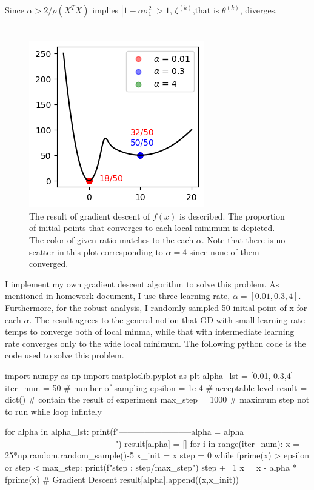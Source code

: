 \documentclass[10pt]{article}
\begin{document}
Since $\alpha > 2/\rho(X^TX)$ implies $\left|1-\alpha \sigma_1^2\right|>1$, $\zeta^{(k)}$,that is $\theta^{(k)}$, diverges.



\section{}
\begin{figure}[!h]
    \begin{center}
        \includegraphics{Fig1.png}
        \caption{The result of gradient descent of $f(x)$ is described. The proportion of initial points that converges to each local minimum is depicted. The color of given ratio matches to the each $\alpha$. Note that there is no scatter in this plot corresponding to $\alpha = 4$ since none of them converged. }
    \end{center}
\end{figure}

I implement my own gradient descent algorithm to solve this problem. As mentioned in homework document, I use three learning rate, $\alpha = [0.01,0.3,4]$. Furthermore,
for the robust analysis, I randomly sampled 50 initial point of x for each $\alpha$. The result agrees to the general notion that GD with small learning rate temps to converge both of local minma, while that with intermediate learning rate converges only to the wide local minimum. 
The following python code is the code used to solve this problem.

\begin{python}
import numpy as np
import matplotlib.pyplot as plt
alpha_lst = [0.01, 0.3,4]
iter_num = 50 # number of sampling
epsilon = 1e-4 # acceptable level
result = dict() # contain the result of experiment
max_step = 1000 # maximum step not to run while loop infintely

for alpha in alpha_lst:
    print(f"--------------------------alpha = {alpha}---------------------------------------")
    result[alpha] = []
    for i in range(iter_num):
        x = 25*np.random.random_sample()-5
        x_init = x
        step = 0
        while fprime(x) > epsilon or step < max_step:
            print(f"step : {step}/{max_step}")
            step +=1
            x = x - alpha * fprime(x) # Gradient Descent
        result[alpha].append((x,x_init))
\end{python}
\end{document}
